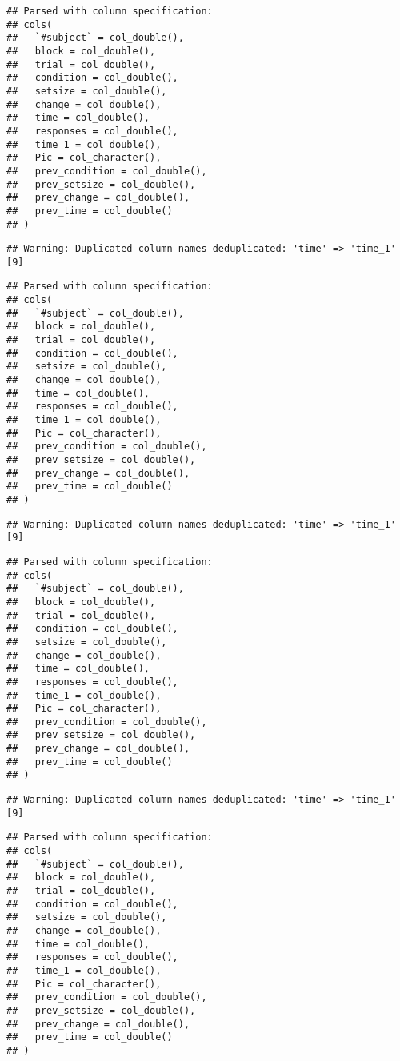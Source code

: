 \documentclass[
]{article}
\begin{document}
\begin{verbatim}
## Parsed with column specification:
## cols(
##   `#subject` = col_double(),
##   block = col_double(),
##   trial = col_double(),
##   condition = col_double(),
##   setsize = col_double(),
##   change = col_double(),
##   time = col_double(),
##   responses = col_double(),
##   time_1 = col_double(),
##   Pic = col_character(),
##   prev_condition = col_double(),
##   prev_setsize = col_double(),
##   prev_change = col_double(),
##   prev_time = col_double()
## )
\end{verbatim}

\begin{verbatim}
## Warning: Duplicated column names deduplicated: 'time' => 'time_1' [9]
\end{verbatim}

\begin{verbatim}
## Parsed with column specification:
## cols(
##   `#subject` = col_double(),
##   block = col_double(),
##   trial = col_double(),
##   condition = col_double(),
##   setsize = col_double(),
##   change = col_double(),
##   time = col_double(),
##   responses = col_double(),
##   time_1 = col_double(),
##   Pic = col_character(),
##   prev_condition = col_double(),
##   prev_setsize = col_double(),
##   prev_change = col_double(),
##   prev_time = col_double()
## )
\end{verbatim}

\begin{verbatim}
## Warning: Duplicated column names deduplicated: 'time' => 'time_1' [9]
\end{verbatim}

\begin{verbatim}
## Parsed with column specification:
## cols(
##   `#subject` = col_double(),
##   block = col_double(),
##   trial = col_double(),
##   condition = col_double(),
##   setsize = col_double(),
##   change = col_double(),
##   time = col_double(),
##   responses = col_double(),
##   time_1 = col_double(),
##   Pic = col_character(),
##   prev_condition = col_double(),
##   prev_setsize = col_double(),
##   prev_change = col_double(),
##   prev_time = col_double()
## )
\end{verbatim}

\begin{verbatim}
## Warning: Duplicated column names deduplicated: 'time' => 'time_1' [9]
\end{verbatim}

\begin{verbatim}
## Parsed with column specification:
## cols(
##   `#subject` = col_double(),
##   block = col_double(),
##   trial = col_double(),
##   condition = col_double(),
##   setsize = col_double(),
##   change = col_double(),
##   time = col_double(),
##   responses = col_double(),
##   time_1 = col_double(),
##   Pic = col_character(),
##   prev_condition = col_double(),
##   prev_setsize = col_double(),
##   prev_change = col_double(),
##   prev_time = col_double()
## )
\end{verbatim}
\end{document}
